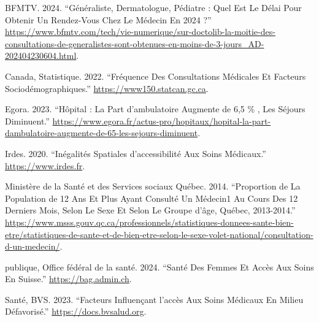 \documentclass[
]{article}
\newlength{\cslhangindent}
\newenvironment{CSLReferences}[2] %
 {\begin{list}{}{%
  \setlength{\itemindent}{0pt}
  \setlength{\leftmargin}{0pt}
  \setlength{\parsep}{0pt}
  \ifodd #1
   \setlength{\leftmargin}{\cslhangindent}
   \setlength{\itemindent}{-1\cslhangindent}
  \fi
  \setlength{\itemsep}{#2\baselineskip}}}
 {\end{list}}
\begin{document}
\label{refs}
\begin{CSLReferences}{1}{0}
BFMTV. 2024. {``Généraliste, Dermatologue, Pédiatre : Quel Est Le Délai
Pour Obtenir Un Rendez-Vous Chez Le Médecin En 2024 ?''}
\url{https://www.bfmtv.com/tech/vie-numerique/sur-doctolib-la-moitie-des-consultations-de-generalistes-sont-obtenues-en-moins-de-3-jours_AD-202404230604.html}.

Canada, Statistique. 2022. {``Fréquence Des Consultations Médicales Et
Facteurs Sociodémographiques.''} \url{https://www150.statcan.gc.ca}.

Egora. 2023. {``Hôpital : La Part d'ambulatoire Augmente de 6,5 \% , Les
Séjours Diminuent.''}
\url{https://www.egora.fr/actus-pro/hopitaux/hopital-la-part-dambulatoire-augmente-de-65-les-sejours-diminuent}.

Irdes. 2020. {``Inégalités Spatiales d'accessibilité Aux Soins
Médicaux.''} \url{https://www.irdes.fr}.

Ministère de la Santé et des Services sociaux Québec. 2014.
{``Proportion de La Population de 12 Ans Et Plus Ayant Consulté Un
Médecin1 Au Cours Des 12 Derniers Mois, Selon Le Sexe Et Selon Le Groupe
d'âge, Québec, 2013-2014.''}
\url{https://www.msss.gouv.qc.ca/professionnels/statistiques-donnees-sante-bien-etre/statistiques-de-sante-et-de-bien-etre-selon-le-sexe-volet-national/consultation-d-un-medecin/}.

publique, Office fédéral de la santé. 2024. {``Santé Des Femmes Et Accès
Aux Soins En Suisse.''} \url{https://bag.admin.ch}.

Santé, BVS. 2023. {``Facteurs Influençant l'accès Aux Soins Médicaux En
Milieu Défavorisé.''} \url{https://docs.bvsalud.org}.

\end{CSLReferences}
\end{document}
